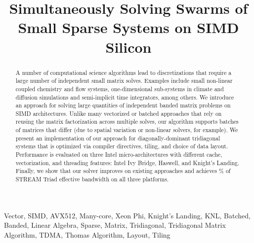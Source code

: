 \documentclass[10pt, conference, compsocconf]{IEEEtran}
\newcommand{\textapprox}{\texttildelow}
\begin{document}

\title{Simultaneously Solving Swarms of Small Sparse Systems on SIMD Silicon}

\author{
}

\maketitle


\begin{abstract}
A number of computational science algorithms lead to discretizations
  that require a large number of independent small matrix solves.
Examples include small non-linear coupled chemistry and flow systems,
  one-dimensional sub-systems in climate and diffusion simulations and 
  semi-implicit time integrators, among others.
We introduce an approach for solving large quantities of independent banded
  matrix problems on SIMD architectures.
Unlike many vectorized or batched approaches that rely on reusing
  the matrix factorization across multiple solves, our algorithm supports
  batches of matrices that differ (due to
  spatial variation or non-linear solvers, for example).
We present an implementation of our approach for diagonally-dominant
  tridiagonal systems that is optimized via compiler directives, tiling, and
  choice of data layout.
Performance is evaluated on three Intel micro-architectures with different
  cache, vectorization, and threading features: Intel Ivy Bridge, Haswell, and
  Knight's Landing.
Finally, we show that our solver improves on existing approaches and achieves
  \textapprox 90\% of STREAM Triad effective bandwidth on all three platforms. 
\end{abstract}

\begin{IEEEkeywords}
Vector, SIMD, AVX512, Many-core, Xeon Phi, Knight's Landing, KNL, Batched,
Banded, Linear Algebra, Sparse, Matrix, Tridiagonal, Tridiagonal Matrix
Algorithm, TDMA, Thomas Algorithm, Layout, Tiling
\end{IEEEkeywords}
\end{document}
